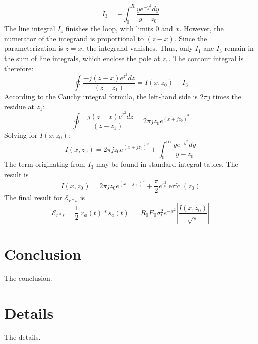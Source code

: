 \documentclass[amsmath,amssymb,aps,prd,10pt,twocolumn,showkeys]{revtex4}
\DeclareMathOperator\erfc{erfc}
\begin{document}
\begin{itemize}
\begin{equation}
I_3 = -\int_0^{R} \frac{ye^{-y^2}dy}{y-z_0}
\end{equation}
The line integral $I_4$ finishes the loop, with limits $0$ and $x$.  However, the numerator of the integrand is proportional to $(z-x)$. Since the parameterization is $z=x$, the integrand vanishes.  Thus, only $I_1$ ane $I_3$ remain in the sum of line integrals, which enclose the pole at $z_1$.  The contour integral is therefore:
\begin{equation}
\oint \frac{-j(z-x)e^{z^2}dz}{(z-z_1)} = I(x,z_0) + I_3
\end{equation}
According to the Cauchy integral formula, the left-hand side is $2\pi j$ times the residue at $z_1$:
\begin{equation}
\oint \frac{-j(z-x)e^{z^2}dz}{(z-z_1)} = 2\pi j z_0 e^{(x+jz_0)^2}
\end{equation}
Solving for $I(x,z_0)$:
\begin{equation}
I(x,z_0) = 2\pi j z_0 e^{(x+jz_0)^2} + \int_0^{\infty} \frac{ye^{-y^2}dy}{y-z_0}
\end{equation}
The term originating from $I_3$ may be found in standard integral tables.  The result is 
\begin{equation}
\boxed{
I(x,z_0) = 2\pi j z_0 e^{(x+jz_0)^2} + \frac{\pi}{2}e^{z_0^2}\erfc(z_0)}
\end{equation}
The final result for $\mathcal{E}_{r * s}$ is
\begin{equation}
\mathcal{E}_{r * s} = \frac{1}{2}| r_a(t) * s_a(t)| = R_0 E_0 \sigma_t^2 e^{-x^2} \left|\frac{I(x,z_0)}{\sqrt{\pi}}\right|
\end{equation}
\end{itemize}

\section{Conclusion}
\label{sec:conc}

The conclusion.

\appendix

\section{Details}
\label{app:a}

The details.


\end{document}
